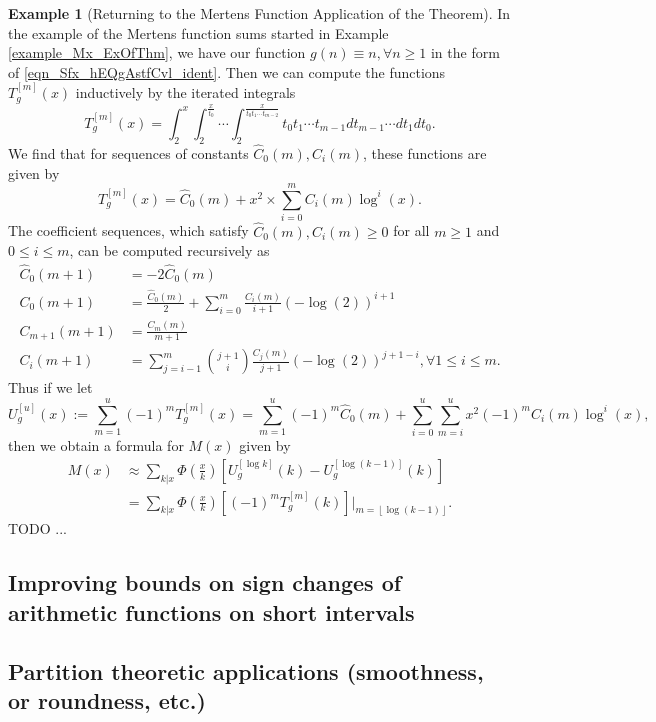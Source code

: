 \documentclass[11pt,reqno]{amsart}
\numberwithin{figure}{section}
\numberwithin{table}{section}
\newcommand{\floor}[1]{\left\lfloor #1 \right\rfloor}
\theoremstyle{plain}
\numberwithin{theorem}{section}
\theoremstyle{definition}
\newtheorem{example}[theorem]{Example}
\begin{document}
\begin{example}[Returning to the Mertens Function Application of the Theorem]
In the example of the Mertens function sums started in Example \ref{example_Mx_ExOfThm}, we have our 
function $g(n) \equiv n, \forall n \geq 1$ in the form of 
\eqref{eqn_Sfx_hEQgAstfCvl_ident}. Then we can compute the functions $T_g^{[m]}(x)$ inductively by the 
iterated integrals 
\[
T_g^{[m]}(x) = \int_2^{x} \int_2^{\frac{x}{t_0}} \cdots \int_2^{\frac{x}{t_0t_1 \cdots t_{m-2}}} 
     t_0 t_1 \cdots t_{m-1} dt_{m-1} \cdots dt_1 dt_0. 
\]
We find that for sequences of constants $\hat{C}_0(m), C_i(m)$, these functions are given by 
\[
T_g^{[m]}(x) = \hat{C}_0(m) + x^2 \times \sum_{i=0}^{m} C_i(m) \log^{i}(x). 
\]
The coefficient sequences, which satisfy $\hat{C}_0(m), C_i(m) \geq 0$ for all $m \geq 1$ and 
$0 \leq i \leq m$, can be computed recursively as 
\begin{align*} 
\hat{C}_0(m+1) & = -2 \hat{C}_0(m) \\ 
C_0(m+1) & = \frac{\hat{C}_0(m)}{2} + \sum_{i=0}^m \frac{C_i(m)}{i+1} (-\log(2))^{i+1} \\ 
C_{m+1}(m+1) & = \frac{C_m(m)}{m+1} \\ 
C_i(m+1) & = \sum_{j=i-1}^{m} \binom{j+1}{i} \frac{C_j(m)}{j+1} (-\log(2))^{j+1-i}, \forall 1 \leq i \leq m. 
\end{align*} 
Thus if we let 
\[
U_g^{[u]}(x) := \sum_{m=1}^{u} (-1)^m T_g^{[m]}(x) = \sum_{m=1}^u (-1)^{m} \hat{C}_0(m) + 
     \sum_{i=0}^u \sum_{m=i}^{u} x^2 (-1)^m C_i(m) \log^{i}(x), 
\]
then we obtain a formula for $M(x)$ given by 
\begin{align*} 
M(x) & \approx \sum_{k|x} \Phi\left(\frac{x}{k}\right) \left[U_g^{[\log k]}(k) - U_g^{[\log(k-1)]}(k)\right] \\ 
     & = \sum_{k|x} \Phi\left(\frac{x}{k}\right) \left[(-1)^m T_g^{[m]}(k)\right]\Biggr|_{m=\floor{\log(k-1)}}. 
\end{align*} 
TODO ... 
\end{example} 

\subsection{Improving bounds on sign changes of arithmetic functions on short intervals} 

\subsection{Partition theoretic applications (smoothness, or roundness, etc.)} 
\end{document}
